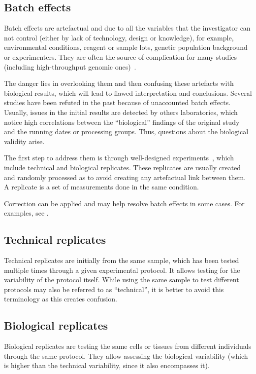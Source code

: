 \subsection{Batch effects}\label{sub:BatchEffect}

Batch effects are artefactual and due to all the variables
that the investigator can not control
(either by lack of technology, design or knowledge), for example,
environmental conditions, reagent or sample lots,
genetic population background or experimenters.
They are often the source of complication for many studies
(including high-throughput genomic ones)~.\mybr\

The danger lies in overlooking them and then confusing these artefacts
with biological results, which will lead to flawed interpretation and conclusions.
Several studies have been refuted in the past because of unaccounted batch effects.
Usually, issues in the initial results are detected by others laboratories,
which notice high correlations between the \enquote{biological} findings
of the original study and the running dates or processing groups.
Thus, questions about the biological validity arise.\mybr\

The first step to address them is through well-designed experiments~,
which include technical and biological replicates.
These replicates are usually created and randomly processed
as to avoid creating any artefactual link between them.
A replicate is a set of measurements done in the same condition.\mybr\

Correction can be applied and may help resolve batch effects in some cases.
For examples, see \citet{Oytam2016-rb,Gagnon-Bartsch2012-dj,Peixoto2015-wg}.\mybr\

\subsection{Technical replicates}
Technical replicates are initially from the same sample,
which has been tested multiple times through a given experimental protocol.
It allows testing for the variability of the protocol itself.
While using the same sample to test different protocols
may also be referred to as \enquote{technical},
it is better to avoid this terminology as this creates confusion.\mybr\

\subsection{Biological replicates}
Biological replicates are testing the same cells or tissues from different individuals
through the same protocol.
They allow assessing the biological variability
(which is higher than the technical variability, since it also encompasses it).\mybr\

